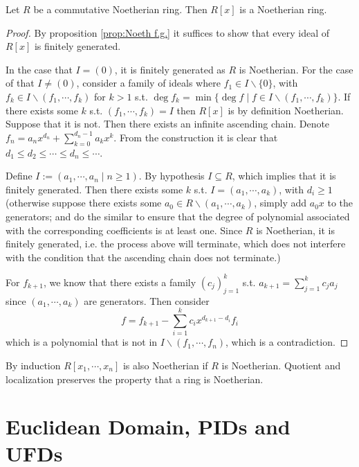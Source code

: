 \documentclass{article}
\begin{document}
\begin{theorem}
    Let $R$ be a commutative Noetherian ring. Then $R[x]$ is a Noetherian ring.
\end{theorem}

\begin{proof}
    By proposition \ref{prop:Noeth f.g.} it suffices to show that every ideal of $R[x]$ is finitely generated. 

    In the case that $I = (0)$, it is finitely generated as $R$ is Noetherian. For the case of that $I \neq (0)$, consider a family of ideals where $f_1 \in I\smallsetminus\{0\}$, with $f_k \in I \smallsetminus (f_1, \cdots, f_k)$ for $k > 1$ s.t. $\deg f_k = \min \{\deg f \mid f \in I \smallsetminus (f_1, \cdots, f_k) \}$. If there exists some $k$ s.t. $(f_1, \cdots, f_k) = I$ then $R[x]$ is by definition Noetherian. Suppose that it is not. Then there exists an infinite ascending chain. Denote $f_n = a_n x^{d_n} + \sum\limits_{k=0}^{d_n - 1} a_k x^k$. From the construction it is clear that $d_1 \leq d_2 \leq\cdots\leq d_n\leq\cdots$.

    Define $I := (a_1, \cdots, a_n \mid n \geq 1)$. By hypothesis $I \subseteq R$, which implies that it is finitely generated. Then there exists some $k$ s.t. $I = (a_1, \cdots, a_k)$, with $d_i \geq 1$ (otherwise suppose there exists some $a_0\in R\smallsetminus (a_1, \cdots, a_k)$, simply add $a_0 x$ to the generators; and do the similar to ensure that the degree of polynomial associated with the corresponding coefficients is at least one. Since $R$ is Noetherian, it is finitely generated, i.e. the process above will terminate, which does not interfere with the condition that the ascending chain does not terminate.) 
    
    For $f_{k+1}$, we know that there exists a family $(c_j)_{j=1}^k$ s.t. $a_{k+1} = \sum\limits_{j=1}^k c_j a_j$ since $(a_1, \cdots, a_k)$ are generators. Then consider
    \[
        f = f_{k+1} - \sum\limits_{i=1}^k c_i x^{d_{k+1} - d_i} f_i
    \]
    which is a polynomial that is not in $I\smallsetminus (f_1, \cdots, f_n)$, which is a contradiction.
\end{proof}

\begin{corollary}
    By induction $R[x_1, \cdots, x_n]$ is also Noetherian if $R$ is Noetherian. Quotient and localization preserves the property that a ring is Noetherian.
\end{corollary}

\section{Euclidean Domain, PIDs and UFDs}
\end{document}

